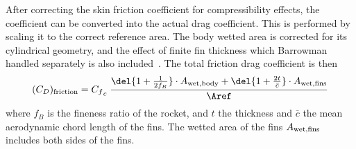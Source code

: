 After correcting the skin friction coefficient for compressibility
effects, the coefficient can be converted into the actual drag
coefficient.  This is performed by scaling it to the correct reference
area.  The body wetted area is corrected for its cylindrical geometry,
and the effect of finite fin thickness which Barrowman handled
separately is also included~\cite[p.~55]{barrowman-thesis}.  The total
friction drag coefficient is then
%
\begin{equation}
(C_D)_{\rm friction} = {C_f}_c \; \frac{
  \del{1 + \frac{1}{2f_B}} \cdot A_{\rm wet,body} + 
  \del{1 + \frac{2t}{\bar c}} \cdot A_{\rm wet,fins}}
   {\Aref}
\label{eq-friction-drag-scale}
\end{equation}
%
where $f_B$ is the fineness ratio of the rocket, and $t$ the thickness
and $\bar c$ the mean aerodynamic chord length of the fins.  The
wetted area of the fins $A_{\rm wet,fins}$ includes both sides of the
fins.


